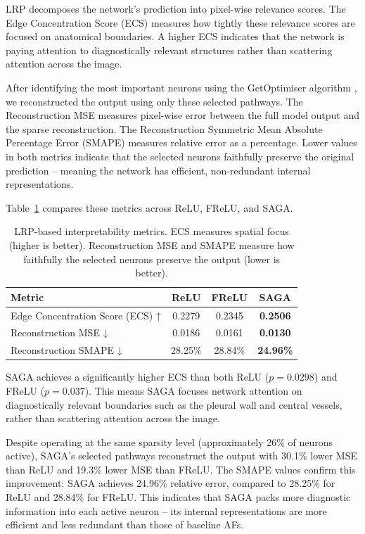 LRP decomposes the network's prediction into pixel-wise relevance scores. The Edge Concentration Score (ECS) measures how tightly these relevance scores are focused on anatomical boundaries. A higher ECS indicates that the network is paying attention to diagnostically relevant structures rather than scattering attention across the image.

After identifying the most important neurons using the GetOptimiser algorithm \citep{bhati2025neural}, we reconstructed the output using only these selected pathways. The Reconstruction MSE measures pixel-wise error between the full model output and the sparse reconstruction. The Reconstruction  Symmetric Mean Absolute Percentage Error (SMAPE) measures relative error as a percentage. Lower values in both metrics indicate that the selected neurons faithfully preserve the original prediction – meaning the network has efficient, non-redundant internal representations.

Table~\ref{tab:saga_lrp} compares these metrics across ReLU, FReLU, and SAGA.

\begin{table}[H]
	\centering
	\caption{LRP-based interpretability metrics. ECS measures spatial focus (higher is better). Reconstruction MSE and SMAPE measure how faithfully the selected neurons preserve the output (lower is better).}
	\label{tab:saga_lrp}
	\begin{tabular}{lccc}
		\toprule
		Metric & ReLU & FReLU & SAGA \\
		\midrule
		Edge Concentration Score (ECS) ↑ & 0.2279 & 0.2345 & \textbf{0.2506} \\
		Reconstruction MSE ↓ & 0.0186 & 0.0161 & \textbf{0.0130} \\
		Reconstruction SMAPE ↓ & 28.25\% & 28.84\% & \textbf{24.96\%} \\
		\bottomrule
	\end{tabular}
\end{table}

SAGA achieves a significantly higher ECS than both ReLU (\(p = 0.0298\)) and FReLU (\(p = 0.037\)). This means SAGA focuses network attention on diagnostically relevant boundaries such as the pleural wall and central vessels, rather than scattering attention across the image.

Despite operating at the same sparsity level (approximately 26\% of neurons active), SAGA's selected pathways reconstruct the output with 30.1\% lower MSE than ReLU and 19.3\% lower MSE than FReLU. The SMAPE values confirm this improvement: SAGA achieves 24.96\% relative error, compared to 28.25\% for ReLU and 28.84\% for FReLU. This indicates that SAGA packs more diagnostic information into each active neuron – its internal representations are more efficient and less redundant than those of baseline AFs.

